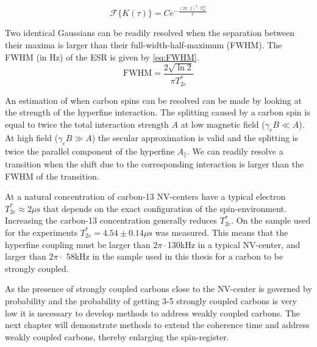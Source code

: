 \begin{equation}
    \mathcal{F} \{ K(\tau) \} =  C e^{-\tfrac{(2\pi \cdot f) ^2 \cdot T_{2e}^{*2}}{ 4}}
    \label{eq:ESR_dip_shape}
\end{equation}

Two identical Gaussians can be readily resolved when the separation between their maxima is larger than their full-width-half-maximum (FWHM).
The FWHM (in Hz) of the ESR is given by \cref{eq:FWHM}.
\begin{equation}
    \mathrm{FWHM} =  \frac{2\sqrt{\ln{2}}}{\pi T_{2e}^*}
    \label{eq:FWHM}
\end{equation}

An estimation of when carbon spins can be resolved can be made by looking at the strength of the hyperfine interaction.
The splitting caused by a carbon spin is equal to twice the total interaction strength $A$ at low magnetic field ($\gamma_e B \ll A$).
At high field ($\gamma_e B \gg A$) the secular approximation is valid and the splitting is twice the parallel component of the hyperfine $A_\parallel$.
We can readily resolve a transition when the shift due to the corresponding interaction is larger than the FWHM of the transition.

At a natural concentration of carbon-13 NV-centers have a typical  electron $T_{2e}^* \approx 2\mu \mathrm{s}$ that depends on the exact configuration of the spin-environment.
Increasing the carbon-13 concentration generally reduces $T_{2e}^*$.
On the sample used for the experiments $T_{2e}^*=4.54 \pm 0.14 \mu\mathrm{s}$ was measured.
This means that the hyperfine coupling must be larger than $2\pi\cdot$130kHz in a typical NV-center, and larger than $2\pi\cdot$ 58kHz in the sample used in this thesis for a carbon to be strongly coupled.

As the presence of strongly coupled carbons close to the NV-center is governed by probability and the probability of getting 3-5 strongly coupled carbons is very low it is necessary to develop methods to address weakly coupled carbons.
The next chapter will demonstrate methods to extend the coherence time and address weakly coupled carbons, thereby enlarging the spin-register.

